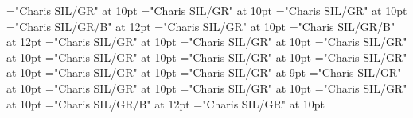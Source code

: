 \documentclass[gps1,twoside]{article}
\begin{document}
\font\spanspanabbreviationvariantentrytypevariantentrytypesvisiblevariantentryrefvisiblevariantentryrefsminorentryvariantbefore="Charis SIL/GR" at 10pt
\font\spanabbreviationvariantentrytypevariantentrytypesvisiblevariantentryrefvisiblevariantentryrefsminorentryvariantlastchildafter="Charis SIL/GR" at 10pt
\font{}="Charis SIL/GR" at 10pt
\font\spanbzhheadwordreferencedentryreferencedentriesvisiblevariantentryrefvisiblevariantentryrefsminorentryvariant="Charis SIL/GR/B" at 12pt
\font\spanspanheadwordreferencedentryreferencedentriesvisiblevariantentryrefvisiblevariantentryrefsminorentryvariantbefore="Charis SIL/GR" at 10pt
\font\spanheadwordreferencedentryreferencedentriesvisiblevariantentryrefvisiblevariantentryrefsminorentryvariant="Charis SIL/GR/B" at 12pt
\font\spanspandefinitionorglossreferencedentryreferencedentriesvisiblevariantentryrefvisiblevariantentryrefsminorentryvariantbefore="Charis SIL/GR" at 10pt
\font\spandefinitionorglossreferencedentryreferencedentriesvisiblevariantentryrefvisiblevariantentryrefsminorentryvariantfirstchildbefore="Charis SIL/GR" at 10pt
\font\spanspansummaryvisiblevariantentryrefvisiblevariantentryrefsminorentryvariantbefore="Charis SIL/GR" at 10pt
\font\spansummaryvisiblevariantentryrefvisiblevariantentryrefsminorentryvariantfirstchildbefore="Charis SIL/GR" at 10pt
\font\spanspancomplexformentryrefsminorentryvariantbefore="Charis SIL/GR" at 10pt
\font\complexformentryrefsminorentryvariantbefore="Charis SIL/GR" at 10pt
\font\complexformentryrefsminorentryvariantafter="Charis SIL/GR" at 10pt
\font\complexformtypecomplexformtypecomplexformtypescomplexformentryrefcomplexformentryrefsminorentryvariantbefore="Charis SIL/GR" at 9pt
\font\complexformtypescomplexformentryrefcomplexformentryrefsminorentryvariantafter="Charis SIL/GR" at 10pt
\font\spanspanabbreviationcomplexformtypecomplexformtypescomplexformentryrefcomplexformentryrefsminorentryvariantbefore="Charis SIL/GR" at 10pt
\font\spanabbreviationcomplexformtypecomplexformtypescomplexformentryrefcomplexformentryrefsminorentryvariantlastchildafter="Charis SIL/GR" at 10pt
\font{}="Charis SIL/GR" at 10pt
\font\spanbzhheadwordreferencedentryreferencedentriescomplexformentryrefcomplexformentryrefsminorentryvariant="Charis SIL/GR/B" at 12pt
\font\spanspanheadwordreferencedentryreferencedentriescomplexformentryrefcomplexformentryrefsminorentryvariantbefore="Charis SIL/GR" at 10pt
\end{document}
